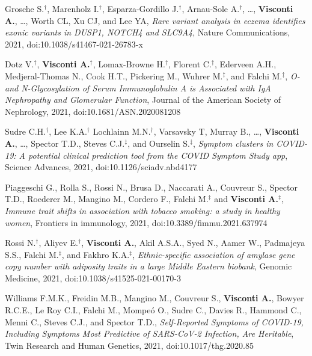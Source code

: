 \documentclass[a4paper,10pt]{article}
\begin{document}
{\begin{itemize}
	    Grosche S.$^{\textbf{$\dag $}}$, Marenholz I.$^{\textbf{$\dag $}}$, Esparza-Gordillo J.$^{\textbf{$\dag $}}$, Arnau-Sole A.$^{\textbf{$\dag $}}$, \dots, \textbf{Visconti A.}, \dots, Worth CL, Xu CJ, and Lee YA, \emph{Rare variant analysis in eczema identifies exonic variants in DUSP1, NOTCH4 and SLC9A4}, Nature Communications, 2021, doi:10.1038/s41467-021-26783-x

	    Dotz V.$^{\textbf{$\dag $}}$, \textbf{Visconti A.}$^{\textbf{$\dag $}}$, Lomax-Browne H.$^{\textbf{$\dag $}}$, Florent C.$^{\textbf{$\dag $}}$, Ederveen A.H., Medjeral-Thomas N., Cook H.T., Pickering M.,  Wuhrer M.$^{\textbf{$\ddag $}}$, and Falchi M.$^{\textbf{$\ddag $}}$, \emph{O- and N-Glycosylation of Serum Immunoglobulin A is Associated with IgA Nephropathy and Glomerular Function}, Journal of the American Society of Nephrology, 2021, doi:10.1681/ASN.2020081208

		 Sudre C.H.$^{\textbf{$\dag $}}$, Lee K.A.$^{\textbf{$\dag $}}$ Lochlainn M.N.$^{\textbf{$\dag $}}$, Varsavsky T, Murray B., \dots, \textbf{Visconti A.}, \dots, Spector T.D., Steves C.J.$^{\textbf{$\ddag $}}$, and Ourselin S.$^{\textbf{$\ddag $}}$, \emph{Symptom clusters in COVID-19: A potential clinical prediction tool from the COVID Symptom Study app}, Science Advances, 2021, doi:10.1126/sciadv.abd4177

	    Piaggeschi G., Rolla S., Rossi N., Brusa D., Naccarati A., Couvreur S., Spector T.D., Roederer M., Mangino M., Cordero F., Falchi M.$^{\textbf{$\ddag $}}$ and \textbf{Visconti A.}$^{\textbf{$\ddag $}}$, \emph{Immune trait shifts in association with tobacco smoking: a study in healthy women}, Frontiers in immunology, 2021, doi:10.3389/fimmu.2021.637974

	    Rossi N.$^{\textbf{$\dag $}}$, Aliyev E.$^{\textbf{$\dag $}}$, \textbf{Visconti A.}, Akil A.S.A., Syed N., Aamer W., Padmajeya S.S., Falchi M.$^{\textbf{$\ddag $}}$, and Fakhro K.A.$^{\textbf{$\ddag $}}$, \emph{Ethnic-specific association of amylase gene copy number with adiposity traits in a large Middle Eastern biobank}, Genomic Medicine, 2021, doi:10.1038/s41525-021-00170-3

	   	Williams F.M.K., Freidin M.B., Mangino M., Couvreur S., \textbf{Visconti A.}, Bowyer R.C.E., Le Roy C.I., Falchi M., Mompe\'o O., Sudre C., Davies R., Hammond C., Menni C., Steves C.J., and Spector T.D., \emph{Self-Reported Symptoms of COVID-19, Including Symptoms Most Predictive of SARS-CoV-2 Infection, Are Heritable}, Twin Research and Human Genetics, 2021, doi:10.1017/thg.2020.85


\end{itemize}}
\end{document}

